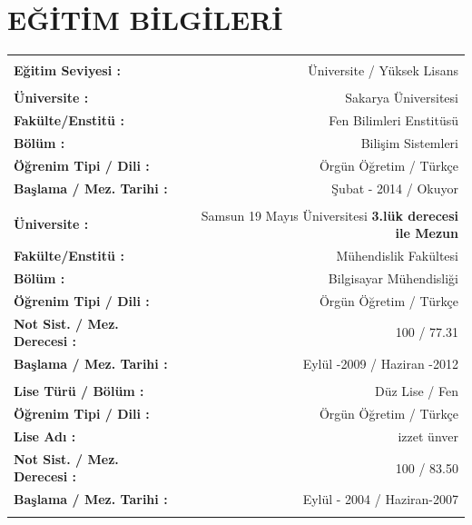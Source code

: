 \documentclass[10pt,a4paper]{article}
\begin{document}
\section{\sc E{\footnotesize Ğ\footnotesize İT\footnotesize İM} B{\footnotesize İLG\footnotesize İLER\footnotesize İ}}
\hspace*{1.6in}\begin{tabular}{lr}
\vspace{0.5 mm}\\
\textbf{Eğitim Seviyesi :} & Üniversite / Yüksek Lisans \\
\vspace{0.5 mm}\\
\textbf{Üniversite :} & Sakarya Üniversitesi \\
\textbf{Fakülte/Enstitü :} & Fen Bilimleri Enstitüsü \\
\textbf{Bölüm :} & Bilişim Sistemleri \\
\textbf{Öğrenim Tipi / Dili :} & Örgün Öğretim / Türkçe\\
\textbf{Başlama / Mez. Tarihi :} & Şubat - 2014 / Okuyor\\
\vspace{0.5 mm}\\
\textbf{Üniversite :} & Samsun 19 Mayıs Üniversitesi \textbf{3.lük derecesi ile Mezun} \\
\textbf{Fakülte/Enstitü :} & Mühendislik Fakültesi \\
\textbf{Bölüm :} & Bilgisayar Mühendisliği \\
\textbf{Öğrenim Tipi / Dili :} & Örgün Öğretim / Türkçe\\
\textbf{Not Sist. / Mez. Derecesi :} & 100 / 77.31 \\
\textbf{Başlama / Mez. Tarihi :} & Eylül -2009 / Haziran -2012\\
\vspace{0.5 mm}\\
\textbf{Lise Türü / Bölüm :} & Düz Lise / Fen\\
\textbf{Öğrenim Tipi / Dili :} & Örgün Öğretim / Türkçe\\
\textbf{Lise Adı :} & izzet ünver\\
\textbf{Not Sist. / Mez. Derecesi :} & 100 / 83.50\\
\textbf{Başlama / Mez. Tarihi :} & Eylül - 2004 / Haziran-2007\\
\vspace{0.5 mm}\\
\end{tabular}
\end{document}
